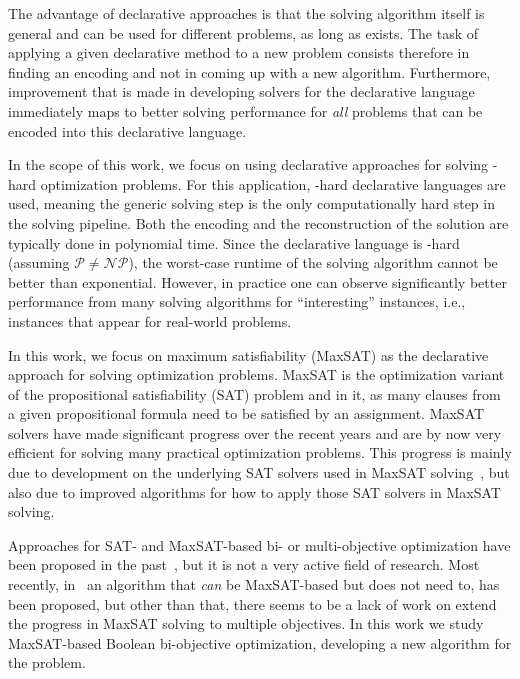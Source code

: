 The advantage of declarative approaches is that the solving algorithm itself is general and can be used for different problems, as long as  exists.
The task of applying a given declarative method to a new problem consists therefore in finding an encoding and not in coming up with a new algorithm.
Furthermore, improvement that is made in developing solvers for the declarative language immediately maps to better solving performance for \emph{all} problems that can be encoded into this declarative language.

In the scope of this work, we focus on using declarative approaches for solving \NP-hard optimization problems.
For this application, \NP-hard declarative languages are used, meaning the generic solving step is the only computationally hard step in the solving pipeline.
Both the encoding and the reconstruction of the solution are typically done in polynomial time.
Since the declarative language is \NP-hard (assuming $\mathcal{P}\neq\mathcal{NP}$), the worst-case runtime of the solving algorithm cannot be better than exponential.
However, in practice one can observe significantly better performance from many solving algorithms for ``interesting'' instances, i.e., instances that appear for real-world problems.


In this work, we focus on maximum satisfiability (MaxSAT) as the declarative approach for solving optimization problems.
MaxSAT is the optimization variant of the propositional satisfiability (SAT) problem and in it, as many clauses from a given propositional formula need to be satisfied by an assignment.
MaxSAT solvers have made significant progress over the recent years and are by now very efficient for solving many practical optimization problems.
This progress is mainly due to development on the underlying SAT solvers used in MaxSAT solving~\autocite{}, but also due to improved algorithms for how to apply those SAT solvers in MaxSAT solving.

Approaches for SAT- and MaxSAT-based bi- or multi-objective optimization have been proposed in the past~\autocite{DBLP:conf/cp/SohBTB17,DBLP:conf/ijcai/Terra-NevesLM18a,DBLP:conf/aaai/Terra-NevesLM18,DBLP:conf/ijcai/Terra-NevesLM18}, but it is not a very active field of research.
Most recently, in~\textcite{DBLP:conf/cp/JanotaMSM21} an algorithm that \emph{can} be MaxSAT-based but does not need to, has been proposed, but other than that, there seems to be a lack of work on extend the progress in MaxSAT solving to multiple objectives.
In this work we study MaxSAT-based Boolean bi-objective optimization, developing a new algorithm for the problem.

